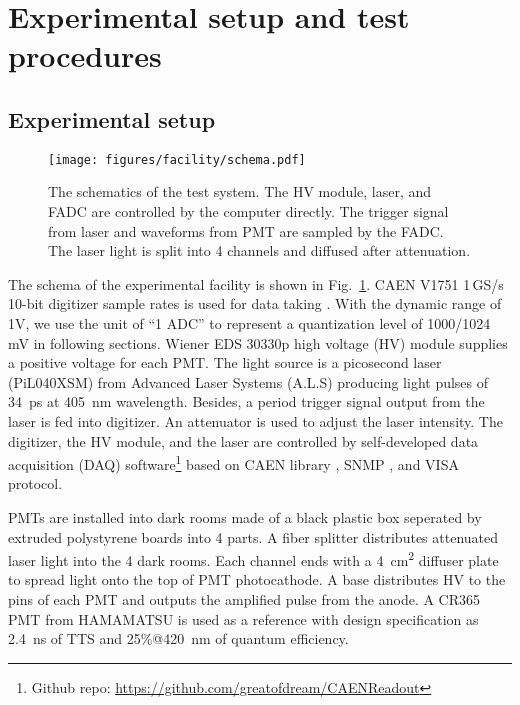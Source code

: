 \section{Experimental setup and test procedures}
\label{SetUp}
\subsection{Experimental setup}
\label{sec:setup}
\begin{figure}[!htbp]
    \centering
    \texttt{[image: figures/facility/schema.pdf]}
    \caption{The schematics of the test system. The HV module, laser, and FADC are controlled by the computer directly. The trigger signal from laser and waveforms from PMT are sampled by the FADC. The laser light is split into 4 channels and diffused after attenuation.}
    \label{fig:facility}
\end{figure}

The schema of the experimental facility is shown in Fig.~\ref{fig:facility}. CAEN V1751 1\,GS/s 10-bit digitizer sample rates is used for data taking \cite{CAENV1751}. With the dynamic range of 1V, we use the unit of ``1 ADC''  to represent a quantization level of 1000/1024\,mV \cite{JUNOPrototype} in following sections. Wiener EDS 30330p high voltage (HV) module \cite{WIENERHV} supplies a positive voltage for each PMT. The light source is a picosecond laser (PiL040XSM) from Advanced Laser Systems (A.L.S) \cite{NTKLaser} producing light pulses of \SI{34}{ps} at \SI{405}{nm} wavelength. Besides, a period trigger signal output from the laser is fed into digitizer. An attenuator is used to adjust the laser intensity. The digitizer, the HV module, and the laser are controlled by self-developed data acquisition (DAQ) software\footnote{Github repo: \url{https://github.com/greatofdream/CAENReadout}} based on CAEN library \cite{CAENLIB}, SNMP \cite{SNMP}, and VISA \cite{VISA} protocol.

PMTs are installed into dark rooms made of a black plastic box seperated by extruded polystyrene boards into 4 parts. A fiber splitter distributes attenuated laser light into the 4 dark rooms. Each channel ends with a \SI{4}{cm\tothe{2}} diffuser plate to spread light onto the top of PMT photocathode.
A base distributes HV to the pins of each PMT and outputs the amplified pulse from the anode. A CR365 PMT \cite{BJBS} from HAMAMATSU is used as a reference with design specification as \SI{2.4}{ns} of TTS and 25\%@\SI{420}{nm} of quantum efficiency.

